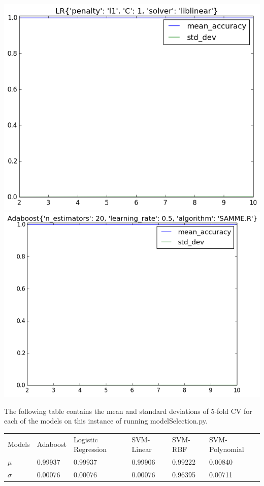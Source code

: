 \documentclass[fleqn]{article}
\begin{document}
    \begin{center}
        \includegraphics[scale=0.3]{model_accuracy_vs_folds_LR.png}
        \includegraphics[scale=0.3]{model_accuracy_vs_folds_Adaboost.png}
    \end{center}

    The following table contains the mean and standard deviations of 5-fold CV for each of
    the models on this instance of running modelSelection.py.\\
    \begin{center}
        \begin{tabular}{llllll}
        Models   & Adaboost & Logistic Regression & SVM-Linear & SVM-RBF & SVM-Polynomial \\
        $\mu$    & 0.99937  & 0.99937             & 0.99906    & 0.99222 & 0.00840        \\
        $\sigma$ & 0.00076  & 0.00076             & 0.00076    & 0.96395 & 0.00711
        \end{tabular}
    \end{center}
\end{document}
